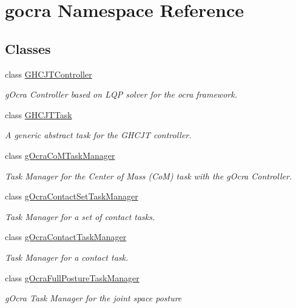 \hypertarget{namespacegocra}{}\section{gocra Namespace Reference}
\label{namespacegocra}
\subsection*{Classes}
\begin{DoxyCompactItemize}
\item 
class \hyperlink{classgocra_1_1GHCJTController}{G\+H\+C\+J\+T\+Controller}
\begin{DoxyCompactList}\small\item\em g\+Ocra Controller based on L\+QP solver for the ocra framework. \end{DoxyCompactList}\item 
class \hyperlink{classgocra_1_1GHCJTTask}{G\+H\+C\+J\+T\+Task}
\begin{DoxyCompactList}\small\item\em A generic abstract task for the G\+H\+C\+JT controller. \end{DoxyCompactList}\item 
class \hyperlink{classgocra_1_1gOcraCoMTaskManager}{g\+Ocra\+Co\+M\+Task\+Manager}
\begin{DoxyCompactList}\small\item\em Task Manager for the Center of Mass (CoM) task with the g\+Ocra Controller. \end{DoxyCompactList}\item 
class \hyperlink{classgocra_1_1gOcraContactSetTaskManager}{g\+Ocra\+Contact\+Set\+Task\+Manager}
\begin{DoxyCompactList}\small\item\em Task Manager for a set of contact tasks. \end{DoxyCompactList}\item 
class \hyperlink{classgocra_1_1gOcraContactTaskManager}{g\+Ocra\+Contact\+Task\+Manager}
\begin{DoxyCompactList}\small\item\em Task Manager for a contact task. \end{DoxyCompactList}\item 
class \hyperlink{classgocra_1_1gOcraFullPostureTaskManager}{g\+Ocra\+Full\+Posture\+Task\+Manager}
\begin{DoxyCompactList}\small\item\em g\+Ocra Task Manager for the joint space posture \end{DoxyCompactList}\item 

\end{DoxyCompactItemize}
